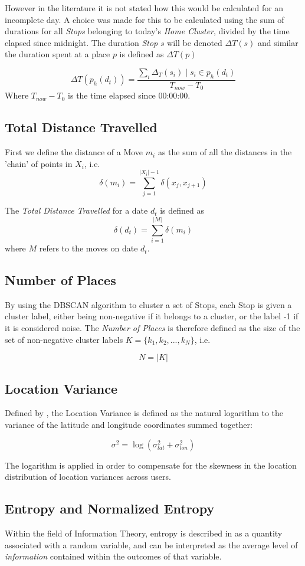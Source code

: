However in the literature \cite{Saeb2015, Canzian2015} it is not stated how this would be calculated for an incomplete day. A choice was made for this to be calculated using the sum of durations for all \textit{Stops} belonging to today's \textit{Home Cluster}, divided by the time elapsed since midnight. The duration \textit{Stop} $s$ will be denoted $\Delta T (s)$ and similar the duration spent at a place $p$ is defined as $\Delta T (p)$

$$\Delta T(p_{h} (d_t) )= \frac{\sum_i \Delta_T (s_i) \;|\; s_i \in p_h (d_t)}{T_{now} - T_{0}}$$
Where $T_{now} - T_0$ is the time elapsed since 00:00:00.

\subsection{Total Distance Travelled}
First we define the distance of a Move $m_i$ as the sum of all the distances in the 'chain' of points in $X_i$, i.e.
$$\delta (m_i)  = \sum_{j=1}^{|X_i|-1} \delta (x_j, x_{j+1})$$

The \textit{Total Distance Travelled} for a date $d_t$ is defined as $$\delta (d_t) = \sum_{i=1}^{|M|} \delta (m_i) $$ where $M$ refers to the moves on date $d_t$.

\subsection{Number of Places}
By using the DBSCAN algorithm to cluster a set of Stops, each Stop is given a cluster label, either being non-negative if it belongs to a cluster, or the label -1 if it is considered noise. The \textit{Number of Places} is therefore defined as the size of the set of non-negative cluster labels $K = \{k_1, k_2, ..., k_N\}$, i.e.

$$N = |K|$$

\subsection{Location Variance}
Defined by \cite{Saeb2015}, the Location Variance is defined as the natural logarithm to the variance of the latitude and longitude coordinates summed together: 

$$\sigma^2 = \log (\sigma_{lat}^2 + \sigma_{lon}^2)$$

The logarithm is applied in order to compensate for the skewness in the location distribution of location variances across users.

\subsection{Entropy and Normalized Entropy}
Within the field of Information Theory, entropy is described in \cite{information-theory} as a quantity associated with a random variable, and can be interpreted as the average level of \textit{information} contained within the outcomes of that variable. 

